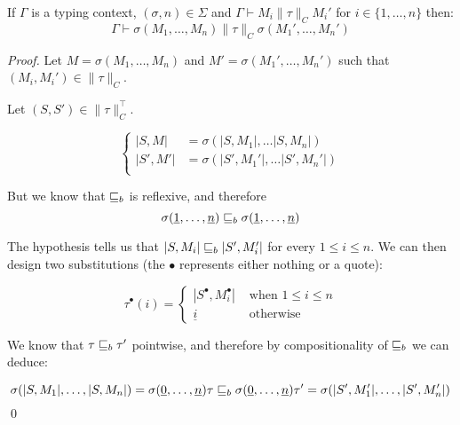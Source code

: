 \begin{alemma}
    If $\Gamma$ is a typing context, $(\sigma,n) \in \Sigma$
    and $\Gamma \vdash M_i \| \tau \|_C M_i'$ for $i \in \{ 1, \dots, n\}$
    then:
    \begin{equation*}
        \Gamma \vdash \sigma(M_1, \dots, M_n) \| \tau \|_C \sigma(M_1', \dots,
        M_n')
    \end{equation*}
\end{alemma}
\begin{proof}
        Let $M = \sigma (M_1, \dots, M_n)$ 
        and $M' = \sigma (M_1', \dots, M_n')$
        such that $(M_i,M_i') \in \| \tau \|_C$.

        Let $(S,S') \in \| \tau \|_C^\top$.

        \begin{equation*}
            \begin{cases}
                |S,M|   &= \sigma (|S,M_1|, \dots |S,M_n|) \\
                |S',M'| &= \sigma (|S',M_1'|, \dots |S',M_n'|) \\
            \end{cases}
        \end{equation*}

        But we know that $\sqsubseteq_b$ is reflexive, and 
        therefore
        \begin{equation*}
            \sigma(\underline{1}, \dots, \underline{n})
            \sqsubseteq_b \sigma(\underline{1}, \dots, \underline{n})
        \end{equation*}

        The hypothesis tells us that $|S,M_i| \sqsubseteq_b |S',M_i'|$
        for every $1 \leq i \leq n$. We can then design
        two substitutions (the $\bullet$ represents either 
        nothing or a quote):

        \begin{equation*}
            \tau^\bullet (i) = \begin{cases}
                |S^\bullet, M_i^\bullet| & \text{ when } 1 \leq i \leq n \\
                \underline{i}            & \text{ otherwise } 
            \end{cases}
        \end{equation*}

        We know that $\tau \sqsubseteq_b \tau'$ pointwise, and therefore
        by compositionality of $\sqsubseteq_b$ we can deduce:

        \begin{equation*}
            \sigma (|S,M_1|, \dots, |S,M_n|)
            = \sigma(\underline{0}, \dots, \underline{n}) \tau
            \sqsubseteq_b
             \sigma(\underline{0}, \dots, \underline{n}) \tau'
            =
            \sigma (|S',M_1'|, \dots, |S',M_n'|)
        \end{equation*}
\qed\end{proof}


